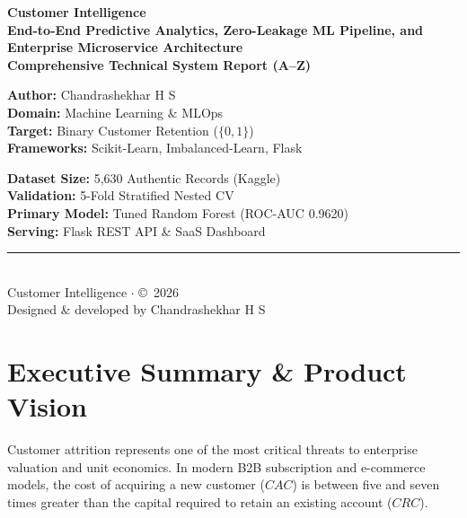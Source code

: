 \documentclass[11pt,a4paper]{article}
\begin{document}
\begin{titlepage}
    \centering
    \vspace*{1.5cm}
    
    {\Huge \textbf{Customer Intelligence}}\\[0.4cm]
    {\LARGE \textbf{End-to-End Predictive Analytics, Zero-Leakage ML Pipeline, and Enterprise Microservice Architecture}}\\[1.5cm]
    
    \textbf{\Large Comprehensive Technical System Report (A--Z)}\\[2cm]
    
    \begin{minipage}{0.48\textwidth}
        \flushleft
        \textbf{Author:} Chandrashekhar H S\\
        \textbf{Domain:} Machine Learning \& MLOps\\
        \textbf{Target:} Binary Customer Retention ($\{0, 1\}$)\\
        \textbf{Frameworks:} Scikit-Learn, Imbalanced-Learn, Flask
    \end{minipage}
    \begin{minipage}{0.48\textwidth}
        \flushright
        \textbf{Dataset Size:} 5,630 Authentic Records (Kaggle)\\
        \textbf{Validation:} 5-Fold Stratified Nested CV\\
        \textbf{Primary Model:} Tuned Random Forest (ROC-AUC 0.9620)\\
        \textbf{Serving:} Flask REST API \& SaaS Dashboard
    \end{minipage}
    
    \vfill
    
    \rule{\textwidth}{0.4pt}\\[0.4cm]
    {\large Customer Intelligence $\cdot$ \copyright\ 2026}\\[0.2cm]
    {\small Designed \& developed by Chandrashekhar H S}
\end{titlepage}

\tableofcontents
\newpage

\section{Executive Summary \& Product Vision}
Customer attrition represents one of the most critical threats to enterprise valuation and unit economics. In modern B2B subscription and e-commerce models, the cost of acquiring a new customer ($CAC$) is between five and seven times greater than the capital required to retain an existing account ($CRC$).
\end{document}
